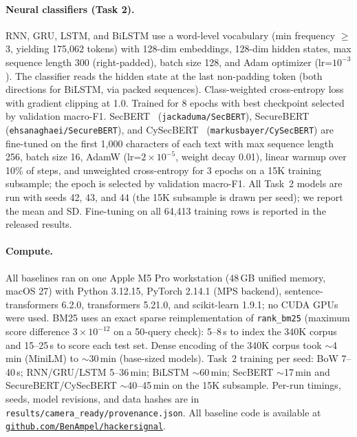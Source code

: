 \documentclass{article}
\begin{document}
\paragraph{Neural classifiers (Task 2).}
RNN, GRU, LSTM, and BiLSTM use a word-level vocabulary (min frequency $\geq$3, yielding 175,062 tokens) with 128-dim embeddings, 128-dim hidden states, max sequence length 300 (right-padded), batch size 128, and Adam optimizer (lr=$10^{-3}$). The classifier reads the hidden state at the last non-padding token (both directions for BiLSTM, via packed sequences). Class-weighted cross-entropy loss with gradient clipping at 1.0. Trained for 8 epochs with best checkpoint selected by validation macro-F1. SecBERT~\citep{secbert2022} (\texttt{jackaduma/SecBERT}), SecureBERT~\citep{aghaei2023securebert} (\texttt{ehsanaghaei/SecureBERT}), and CySecBERT~\citep{bayer2024cysecbert} (\texttt{markusbayer/CySecBERT}) are fine-tuned on the first 1,000 characters of each text with max sequence length 256, batch size 16, AdamW (lr=$2{\times}10^{-5}$, weight decay 0.01), linear warmup over 10\% of steps, and unweighted cross-entropy for 3 epochs on a 15K training subsample; the epoch is selected by validation macro-F1. All Task~2 models are run with seeds 42, 43, and 44 (the 15K subsample is drawn per seed); we report the mean and SD. Fine-tuning on all 64,413 training rows is reported in the released results.

\paragraph{Compute.}
All baselines ran on one Apple M5 Pro workstation (48\,GB unified memory, macOS 27) with Python 3.12.15, PyTorch 2.14.1 (MPS backend), sentence-transformers 6.2.0, transformers 5.21.0, and scikit-learn 1.9.1; no CUDA GPUs were used. BM25 uses an exact sparse reimplementation of \texttt{rank\_bm25} (maximum score difference $3{\times}10^{-12}$ on a 50-query check): 5--8\,s to index the 340K corpus and 15--25\,s to score each test set. Dense encoding of the 340K corpus took ${\sim}$4\,min (MiniLM) to ${\sim}$30\,min (base-sized models). Task~2 training per seed: BoW 7--40\,s; RNN/GRU/LSTM 5--36\,min; BiLSTM ${\sim}$60\,min; SecBERT ${\sim}$17\,min and SecureBERT/CySecBERT ${\sim}$40--45\,min on the 15K subsample. Per-run timings, seeds, model revisions, and data hashes are in \texttt{results/camera\_ready/provenance.json}. All baseline code is available at \href{https://github.com/BenAmpel/hackersignal}{\texttt{github.com/BenAmpel/hackersignal}}.
\end{document}

